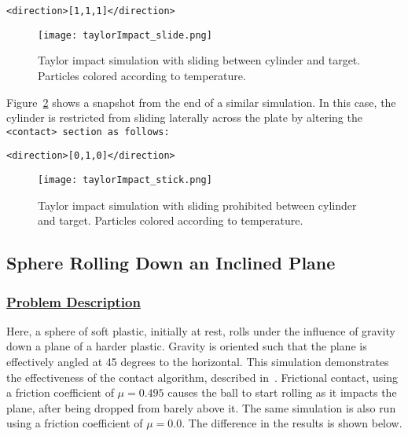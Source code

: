 \begin{Verbatim}[fontsize=\footnotesize]
        <direction>[1,1,1]</direction>
\end{Verbatim}

\begin{figure}
  \center
  \texttt{[image: taylorImpact\_slide.png]}
  \caption{Taylor impact simulation with sliding between cylinder and
           target.  Particles colored according to temperature.}
  \label{fig:taylorImpact_slide}
\end{figure}

Figure~\ref{fig:taylorImpact_stick} shows a snapshot from the end of a
similar simulation.  In this case, the cylinder is restricted from sliding
laterally across the plate by altering the \tt <contact> \normalfont
section as follows:
\begin{Verbatim}[fontsize=\footnotesize]
        <direction>[0,1,0]</direction>
\end{Verbatim}

\begin{figure}
  \center
  \texttt{[image: taylorImpact\_stick.png]}
  \caption{Taylor impact simulation with sliding prohibited between
           cylinder and target.  Particles colored according to temperature.}
  \label{fig:taylorImpact_stick}
\end{figure}

\subsection*{\center Sphere Rolling Down an Inclined Plane}
\subsubsection*{\underline{Problem Description}}
Here, a sphere of soft plastic, initially at rest, rolls under the
influence of gravity down a plane of a harder plastic.  Gravity is
oriented such that the plane is effectively angled at 45 degrees to
the horizontal.  This simulation demonstrates the effectiveness of
the contact algorithm, described in~\cite{bard01}.  Frictional
contact, using a friction coefficient of $\mu = 0.495$ causes the ball
to start rolling as it impacts the plane, after being dropped from
barely above it.  The same simulation is also run using a friction
coefficient of $\mu = 0.0$.  The difference in the results is shown
below.
 
